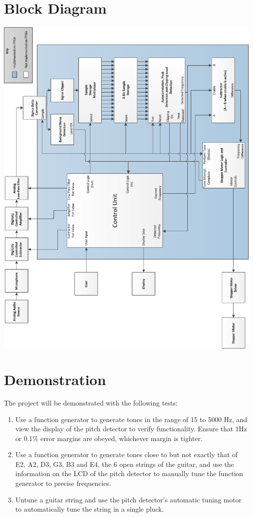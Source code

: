 \documentclass[aps,letterpaper,10pt]{revtex4}
\begin{document}
\newpage
\section{Block Diagram}
\includegraphics[width=\textwidth]{EE119c_block_diagram.png}


\section{Demonstration}
The project will be demonstrated with the following tests:
\begin{enumerate}
\item Use a function generator to generate tones in the range of 15 to 5000 Hz, and view the display of the pitch detector to verify functionality. Ensure that 1Hz or 0.1\% error margins are obeyed, whichever margin is tighter. 
\item Use a function generator to generate tones close to but not exactly that of E2, A2, D3, G3, B3 and E4, the 6 open strings of the guitar, and use the information on the LCD of the pitch detector to manually tune the function generator to precise frequencies. 
\item Untune a guitar string and use the pitch detector's automatic tuning motor to automatically tune the string in a single pluck.
\end{enumerate}
\end{document}
